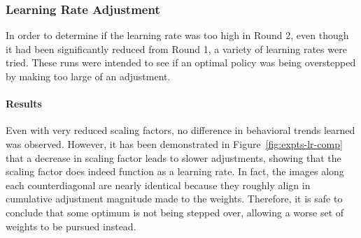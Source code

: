 
\subsubsection*{Learning Rate Adjustment}
\label{sec:findings-expts-learnrate}

In order to determine if the learning rate was too high in Round 2,
even though it had been significantly reduced from Round 1,
a variety of learning rates were tried.
%
These runs were intended to see if an optimal policy was being overstepped by
making too large of an adjustment.


\paragraph*{Results}


Even with very reduced scaling factors,
no difference in behavioral trends learned
was observed.
%
However,
it has been demonstrated in Figure~\ref{fig:expts-lr-comp} that
a decrease in scaling factor leads to slower adjustments,
showing that the scaling factor does indeed function as a learning rate.
%
In fact,
the images along each counterdiagonal
are nearly identical
because they roughly align in
cumulative adjustment magnitude made to the weights.
%
Therefore,
it is safe to conclude that some optimum is not being stepped over,
allowing a worse set of weights to be pursued instead.



